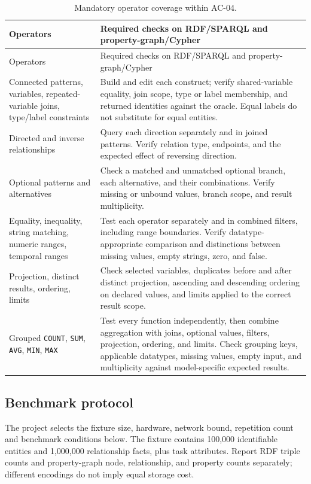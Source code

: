 \documentclass[11pt,a4paper]{article}
\begin{document}
{\small
\begin{longtable}{@{}P{4.6cm}P{11.1cm}@{}}
\caption{Mandatory operator coverage within AC-04.}\label{tab:query-coverage}\\
\toprule Operators & Required checks on RDF/SPARQL and property-graph/Cypher\\\midrule
\endfirsthead\toprule Operators & Required checks on RDF/SPARQL and property-graph/Cypher\\\midrule\endhead
\bottomrule\endlastfoot
Connected patterns, variables, repeated-variable joins, type/label constraints & Build and edit each construct; verify shared-variable equality, join scope, type or label membership, and returned identities against the oracle. Equal labels do not substitute for equal entities.\\
Directed and inverse relationships & Query each direction separately and in joined patterns. Verify relation type, endpoints, and the expected effect of reversing direction.\\
Optional patterns and alternatives & Check a matched and unmatched optional branch, each alternative, and their combinations. Verify missing or unbound values, branch scope, and result multiplicity.\\
Equality, inequality, string matching, numeric ranges, temporal ranges & Test each operator separately and in combined filters, including range boundaries. Verify datatype-appropriate comparison and distinctions between missing values, empty strings, zero, and false.\\
Projection, distinct results, ordering, limits & Check selected variables, duplicates before and after distinct projection, ascending and descending ordering on declared values, and limits applied to the correct result scope.\\
Grouped \texttt{COUNT}, \texttt{SUM}, \texttt{AVG}, \texttt{MIN}, \texttt{MAX} & Test every function independently, then combine aggregation with joins, optional values, filters, projection, ordering, and limits. Check grouping keys, applicable datatypes, missing values, empty input, and multiplicity against model-specific expected results.\\
\end{longtable}}

\subsection{Benchmark protocol}
The project selects the fixture size, hardware, network bound, repetition count and benchmark conditions below. The fixture contains 100,000 identifiable entities and 1,000,000 relationship facts, plus task attributes. Report RDF triple counts and property-graph node, relationship, and property counts separately; different encodings do not imply equal storage cost.
\end{document}
